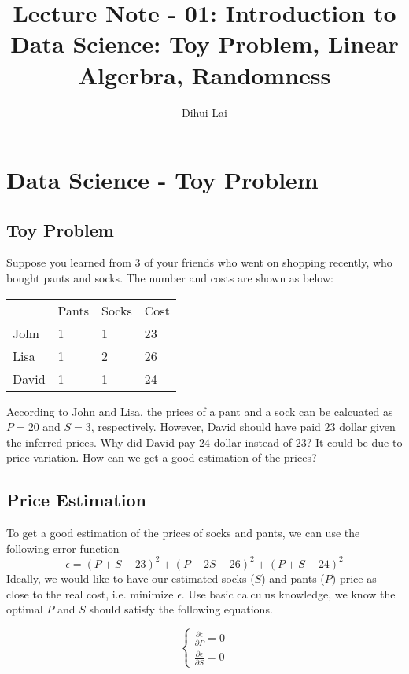 \documentclass[12pt, oneside]{article}
\title{Lecture Note - 01: Introduction to Data Science: Toy Problem, Linear Algerbra, Randomness}
\author{Dihui Lai}
\begin{document}
\maketitle
\tableofcontents

\vspace{.25in}

\section{Data Science - Toy Problem}

\subsection{Toy Problem}
Suppose you learned from 3 of your friends who went on shopping recently, who bought pants and socks. The number and costs are shown as below:

\vspace{.1in}
\begin{tabular}{llll}
 &Pants  &Socks &Cost  \\
 John &1 	 &1      &23   \\
 Lisa &1      &2      &26   \\
 David &1      &1      &24 
\end{tabular}

\vspace{.1in}
According to John and Lisa, the prices of a pant and a sock can be calcuated as $P=20$ and $S=3$, respectively. However, David should have paid $23$ dollar given the inferred prices. Why did David pay $24$ dollar instead of $23$? It could be due to price variation. How can we get a good estimation of the prices?

\subsection{Price Estimation}
To get a good estimation of the prices of socks and pants, we can use the following error function
$$\epsilon=(P+S-23)^2+(P+2S-26)^2+(P+S-24)^2$$
Ideally, we would like to have our estimated socks ($S$) and pants ($P$) price as close to the real cost, i.e. minimize $\epsilon$.
Use basic calculus knowledge, we know the optimal $P$ and $S$ should satisfy the following equations.

\begin{equation}
\begin{cases}
\frac{\partial{\epsilon}}{\partial{P}}=0\\
\frac{\partial{\epsilon}}{\partial{S}}=0
\end{cases}
\end{equation}
\end{document}
